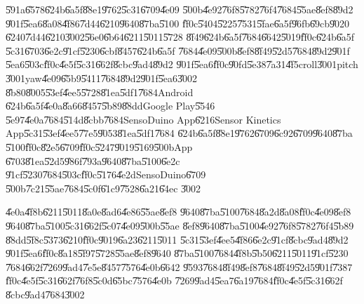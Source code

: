 \bigskip

\U{591a}\U{6578}\U{624b}\U{6a5f}\U{88e1}\U{9762}\U{5c31}\U{6709}\U{4e09}%
\U{500b}\U{4e92}\U{76f8}\U{5782}\U{76f4}\U{7684}\U{55ae}\U{8ef8}\U{89d2}%
\U{901f}\U{5ea6}\U{8a08}\U{4f86}\U{7d44}\U{6210}\U{9640}\U{87ba}\U{5100}%
\U{ff0c}\U{5404}\U{5225}\U{7531}\U{5fae}\U{6a5f}\U{96fb}\U{69cb}\U{9020}%
\U{6240}\U{7d44}\U{6210}\U{3002}\U{56e0}\U{6b64}\U{6211}\U{5011}\U{5728}%
\U{8f49}\U{624b}\U{6a5f}\U{7684}\U{6642}\U{5019}\U{ff0c}\U{624b}\U{6a5f}%
\U{5c31}\U{6703}\U{6e2c}\U{91cf}\U{5230}\U{6cbf}\U{8457}\U{624b}\U{6a5f}%
\U{7684}\U{4e09}\U{500b}\U{8ef8}\U{8f49}\U{52d5}\U{7684}\U{89d2}\U{901f}%
\U{5ea6}\U{503c}\U{ff0c}\U{4e5f}\U{5c31}\U{662f}\U{8cbc}\U{9ad4}\U{89d2}%
\U{901f}\U{5ea6}\U{ff0c}\U{90fd}\U{5e38}\U{7a31}\U{4f5c}roll\U{3001}pitch%
\U{3001}yaw\U{4e09}\U{65b9}\U{5411}\U{7684}\U{89d2}\U{901f}\U{5ea6}\U{3002}%
\U{8b80}\U{8005}\U{53ef}\U{4ee5}\U{5728}\U{81ea}\U{5df1}\U{7684}Android%
\U{624b}\U{6a5f}\U{4e0a}\U{8a66}\U{8457}\U{5b89}\U{88dd}Google Play\U{5546}%
\U{5e97}\U{4e0a}\U{7684}\U{514d}\U{8cbb}\U{7684}SensoDuino App\U{6216}Sensor
Kinetics App\U{5c31}\U{53ef}\U{4ee5}\U{77e5}\U{9053}\U{81ea}\U{5df1}\U{7684}%
\U{624b}\U{6a5f}\U{88e1}\U{9762}\U{6709}\U{6c92}\U{6709}\U{9640}\U{87ba}%
\U{5100}\U{ff0c}\U{82e5}\U{6709}\U{ff0c}\U{5247}\U{9019}\U{5169}\U{500b}App%
\U{6703}\U{81ea}\U{52d5}\U{986f}\U{793a}\U{9640}\U{87ba}\U{5100}\U{6e2c}%
\U{91cf}\U{5230}\U{7684}\U{503c}\U{ff0c}\U{5176}\U{4e2d}SensoDuino\U{6709}%
\U{500b}\U{7c21}\U{55ae}\U{7684}\U{5c0f}\U{61c9}\U{7528}\U{6a21}\U{64ec}%
\U{3002}

\bigskip

\U{4e0a}\U{4f8b}\U{6211}\U{5011}\U{8a0e}\U{8ad6}\U{4e86}\U{55ae}\U{8ef8}%
\U{9640}\U{87ba}\U{5100}\U{7684}\U{8a2d}\U{8a08}\U{ff0c}\U{4e09}\U{8ef8}%
\U{9640}\U{87ba}\U{5100}\U{5c31}\U{662f}\U{5c07}\U{4e09}\U{500b}\U{55ae}%
\U{8ef8}\U{9640}\U{87ba}\U{5100}\U{4e92}\U{76f8}\U{5782}\U{76f4}\U{5b89}%
\U{88dd}\U{5f8c}\U{5373}\U{6210}\U{ff0c}\U{9019}\U{6a23}\U{6211}\U{5011}%
\U{5c31}\U{53ef}\U{4ee5}\U{4f86}\U{6e2c}\U{91cf}\U{8cbc}\U{9ad4}\U{89d2}%
\U{901f}\U{5ea6}\U{ff0c}\U{8a18}\U{5f97}\U{5728}\U{55ae}\U{8ef8}\U{9640}%
\U{87ba}\U{5100}\U{7684}\U{4f8b}\U{5b50}\U{6211}\U{5011}\U{91cf}\U{5230}%
\U{7684}\U{662f}\U{7269}\U{9ad4}\U{7e5e}\U{8457}\U{7576}\U{4e0b}\U{6642}%
\U{9593}\U{7684}\U{8f49}\U{8ef8}\U{7684}\U{8f49}\U{52d5}\U{901f}\U{7387}%
\U{ff0c}\U{4e5f}\U{5c31}\U{662f}\U{76f8}\U{5c0d}\U{65bc}\U{7576}\U{4e0b}%
\U{7269}\U{9ad4}\U{5ea7}\U{6a19}\U{7684}\U{ff0c}\U{4e5f}\U{5c31}\U{662f}%
\U{8cbc}\U{9ad4}\U{7684}\U{3002}

